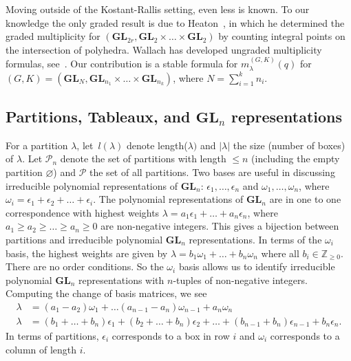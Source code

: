 \documentclass[11pt]{article}
\theoremstyle{definition}
\numberwithin{equation}{section}
\newcommand{\Z}{\mathbb{Z}}
\newcommand{\GL}{\textbf{GL}}
\newcommand{\Par}{\mathcal{P}}
\begin{document}
Moving outside of the Kostant-Rallis setting, even less is known. To our knowledge the only graded result is due to Heaton~\cite{heaton2023graded}, in which he determined the graded multiplicity for $(\GL_{2r}, \GL_2 \times \dots \times \GL_2)$ by counting integral points on the intersection of polyhedra. Wallach has developed ungraded multiplicity formulas, see~\cite{Wallach2017, Wallach2017-2}. Our contribution is a stable formula for $m_\lambda^{(G, K)}(q)$ for $(G,K) = (\GL_N, \GL_{n_1} \times \dots \times \GL_{n_k})$, where $N = \sum_{i=1}^k n_i$.


\subsection{Partitions, Tableaux, and \texorpdfstring{\normalfont $\GL_n$}{GLn} representations }

For a partition $\lambda$, let~$l(\lambda)$ denote length($\lambda)$ and $|\lambda|$ the size (number of boxes) of $\lambda$. Let $\Par_n$ denote the set of partitions with length $\leq n$ (including the empty partition $\varnothing$) and $\Par$ the set of all partitions. Two bases are useful in discussing irreducible polynomial representations of $\GL_n$: $\epsilon_1, \dots , \epsilon_n$  and $\omega_1, \dots , \omega_n$, where $\omega_i = \epsilon_1 + \epsilon_2 + \dots + \epsilon_i$. The polynomial representations of $\GL_n$ are in one to one correspondence with highest weights $\lambda = a_1\epsilon_1 + \dots + a_n \epsilon_n$, where $a_1 \geq a_2 \geq \dots \geq a_n \geq 0$ are non-negative integers. This gives a bijection between partitions and irreducible polynomial $\GL_n$ representations. In terms of the $\omega_i$ basis, the highest weights are given by $\lambda = b_1 \omega_1 + \dots + b_n \omega_n$ where all $b_i \in \Z_{\geq 0}$. There are no order conditions. So the $\omega_i$ basis allows us to identify irreducible polynomial $\GL_n$ representations with $n$-tuples of non-negative integers. Computing the change of basis matrices, we see
\begin{align*}
\lambda &= (a_1 - a_2)\omega_1 + \dots (a_{n-1} - a_n)\omega_{n-1} + a_n \omega_n\\
\lambda &= (b_1 + \dots + b_n) \epsilon_1 + (b_2 + \dots + b_n) \epsilon_2 + \dots + (b_{n-1} + b_n)\epsilon_{n-1} + b_n \epsilon_n.
\end{align*}
In terms of partitions, $\epsilon_i$ corresponds to a box in row $i$ and $\omega_i$ corresponds to a column of length $i$.
\end{document}
